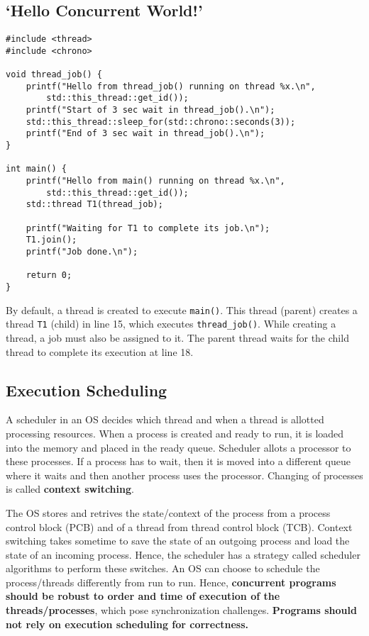 \documentclass{scrartcl}
\begin{document}
\subsection{`Hello Concurrent World!'}
\begin{verbatim}
#include <thread>
#include <chrono>

void thread_job() {
    printf("Hello from thread_job() running on thread %x.\n", 
        std::this_thread::get_id());
    printf("Start of 3 sec wait in thread_job().\n");
    std::this_thread::sleep_for(std::chrono::seconds(3));
    printf("End of 3 sec wait in thread_job().\n");
}

int main() {
    printf("Hello from main() running on thread %x.\n", 
        std::this_thread::get_id());
    std::thread T1(thread_job);

    printf("Waiting for T1 to complete its job.\n");
    T1.join();
    printf("Job done.\n");

    return 0;
}
\end{verbatim}

By default, a thread is created to execute \texttt{main()}. This thread (parent) creates a thread \texttt{T1} (child) in line 15, which executes \texttt{thread_job()}. While creating a thread, a job must also be assigned to it. The parent thread waits for the child thread to complete its execution at line 18.

\subsection{Execution Scheduling}
A scheduler in an OS decides which thread and when a thread is allotted processing resources. When a process is created and ready to run, it is loaded into the memory and placed in the ready queue. Scheduler allots a processor to these processes. If a process has to wait, then it is moved into a different queue where it waits and then another process uses the processor. Changing of processes is called \textbf{context switching}. 

The OS stores and retrives the state/context of the process from a process control block (PCB) and of a thread from thread control block (TCB). Context switching takes sometime to save the state of an outgoing process and load the state of an incoming process. Hence, the scheduler has a strategy called scheduler algorithms to perform these switches. An OS can choose to schedule the process/threads differently from run to run. Hence, \textbf{concurrent programs should be robust to order and time of execution of the threads/processes}, which pose synchronization challenges. \textbf{Programs should not rely on execution scheduling for correctness.}
\end{document}
